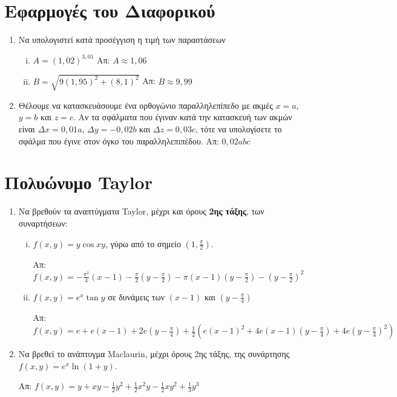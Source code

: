 \section*{Εφαρμογές του Διαφορικού}

\begin{enumerate}
  \item Να υπολογιστεί κατά προσέγγιση η τιμή των παραστάσεων
    \begin{enumerate}[i)]
      \item $A = (1,02)^{3,01} $ \hfill Απ: $ A \approx 1,06 $ 
      \item $B =  \sqrt{ 9(1,95)^{2} + (8,1)^{2} } $ 
        \hfill Απ: $ B \approx 9,99 $ 
    \end{enumerate}

  \item Θέλουμε να κατασκευάσουμε ένα ορθογώνιο παραλληλεπίπεδο με ακμές $ x = a $, 
    $ y=b $ και $ z=c $. Αν τα σφάλματα που έγιναν κατά την κατασκευή των ακμών 
    είναι $ \Delta x = 0,01a $, $ \Delta y = -0,02b $ και $ \Delta z = 0,03c $, 
    τότε να υπολογίσετε το σφάλμα που έγινε στον όγκο του παραλληλεπιπέδου.
    \hfill Απ: $ 0,02abc $ 
\end{enumerate}


\section*{Πολυώνυμο Taylor}

\begin{enumerate}
  \item Να βρεθούν τα αναπτύγματα Taylor, μέχρι και όρους 
    \textbf{2ης τάξης}, των συναρτήσεων:

    \begin{enumerate}[i)]
      \item  $f(x,y)=y\cos{xy} $, γύρω από το σημείο 
        $ \left(1, \frac{ \pi }{ 2 }\right) $.

        \hfill Απ: $f(x,y)=-\frac{\pi^{2}}{4}(x-1) - \frac{ \pi }{ 2 } 
        \left(y - \frac{ \pi }{2 }\right) - \pi(x-1)
        \left(y-\frac{\pi}{2}\right)- \left(y- \frac{ \pi }{ 2} \right)^{2} $

      \item $ f(x,y)=e^{x}\tan{y} $ σε δυνάμεις των $ (x-1) $ και 
        $ \left(y - \frac{ \pi }{ 4 }\right) $

        \hfill Απ: $ f(x,y) = e + e(x-1) + 2e\left(y- \frac{ \pi }{ 4 }\right)
        + \frac{1}{ 2 } \left(e(x-1)^{2}+4e(x-1)\left(y- \frac{ \pi }{ 4 }
        \right) + 4e\left(y- \frac{ \pi }{ 4 } \right)^{2}\right) $
    \end{enumerate}

  \item Να βρεθεί το ανάπτυγμα Maclaurin, μέχρι όρους 2ης τάξης, 
    της συνάρτησης $ f(x,y) = e^{x}\ln(1+y)$.

    \hfill Απ: $ f(x,y)=y + xy - \frac{1}{ 2 } y^{2} + \frac{1}{ 2 } x^{2}y - 
    \frac{1}{ 2 } xy^{2} + \frac{1}{ 3 } y^{3} $

\end{enumerate}

